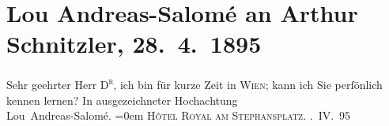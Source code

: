 

         
         \renewcommand{\erwaehntePersonen}{Personen: Lou Andreas-Salomé}
         \renewcommand{\erwaehnteOrte}{Orte: Hotel Royal, Stephansplatz, Wien}
         \renewcommand{\erwaehnteWerke}{}
               \section[Lou Andreas-Salomé an Arthur Schnitzler, 28. 4. 1895]{ Lou Andreas-Salomé an Arthur Schnitzler, 28. 4. 1895}\nopagebreak{}\rehead{ }\begin{ledgroupsized}[t]{13cm}\normalsize\beginnumbering{} \toendnotes[C]{\smallbreak\pagebreak[2]} 
\pstart{}{\pb}Sehr geehrter Herr \textsc{D\textsuperscript{r}},\pend\pstart
           ich bin für kurze Zeit in \textsc{Wien}; kann ich Sie perſönlich kennen lernen?\pend
           \pstart
           In ausgezeichneter Hochachtung{\\[\baselineskip]}\spacefill\mbox{Lou Andreas-Salomé.}\pend
           \leftskip=0em{}\pstart
           \noindent{}\textsc{Hôtel Royal}\pend
           \pstart
           \textsc{am Stephansplatz.}\pend
           . IV. 95\pend
           
         
         \endnumbering{}\end{ledgroupsized}  \newcommand{\dateiname}{L00433}\newcommand{\titel}{Lou Andreas-Salomé an Arthur Schnitzler, 28. 4. 1895}\newcommand{\editorInnen}{Martin Anton Müller und Gerd-Hermann Susen}
      